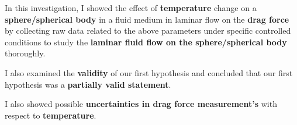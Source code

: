 {In this investigation, I showed the effect of \textbf{temperature} change on a \textbf{sphere/spherical body} in a fluid medium in laminar flow on the \textbf{drag force} by collecting raw data related to the above parameters under specific controlled conditions to study the \textbf{laminar fluid flow on the sphere/spherical body} thoroughly.}

{I also examined the \textbf{validity} of our first hypothesis and concluded that our first hypothesis was a \textbf{partially valid statement}.}

{I also showed possible \textbf{uncertainties in drag force measurement's} with respect to \textbf{temperature}.}

